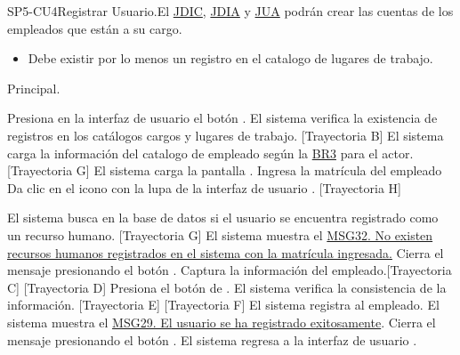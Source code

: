 \begin{UseCase}{SP5-CU4}{Registrar Usuario.}{El \hyperlink{JDIC}{JDIC}, \hyperlink{JDIA}{JDIA} y  \hyperlink{JUA}{JUA} podrán crear las cuentas de los empleados que están a su cargo. }
{\begin{itemize}
            \item Debe existir por lo menos un registro en el catalogo de lugares de trabajo.
        \end{itemize} }

\end{UseCase}

\begin{UCtrayectoria}{Principal.}
    
  \UCpaso[\UCactor] Presiona en la interfaz de usuario  el botón \IUbutton{+}.
    \UCpaso  El sistema verifica la existencia de registros en los catálogos cargos  y  lugares de trabajo. [Trayectoria B] 
    \UCpaso El sistema carga la información del catalogo de empleado  según la \hyperlink{reglas-BR3}{BR3} para el actor. [Trayectoria G]
    \UCpaso El sistema carga la pantalla  .
    \UCpaso[\UCactor] Ingresa la matrícula del empleado 
    \UCpaso[\UCactor] Da clic en el icono con la lupa de la interfaz de usuario . [Trayectoria H]
    
    \UCpaso El sistema busca en la base de datos si el usuario se encuentra registrado como un recurso humano. [Trayectoria G]
    \UCpaso El sistema muestra el \hyperref[MSG29]{MSG32. No existen recursos humanos registrados en el sistema con la matrícula ingresada.}
    \UCpaso[\UCactor] Cierra el mensaje presionando el botón .
    \UCpaso[\UCactor]
    Captura la información del empleado.[Trayectoria C] [Trayectoria D] 
    \UCpaso[\UCactor]  Presiona el botón de .
    \UCpaso El sistema verifica la consistencia de la información. [Trayectoria E] [Trayectoria F]
    \UCpaso El sistema registra al empleado.
    \UCpaso  El sistema muestra el \hyperref[MSG29]{MSG29. El usuario se ha registrado exitosamente}.    
    \UCpaso[\UCactor] Cierra el mensaje presionando el botón .
    \UCpaso El sistema regresa a la interfaz de usuario .
\end{UCtrayectoria}


